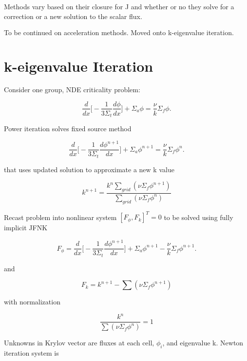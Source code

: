 \documentclass{article}
\begin{document}
Methods vary based on their closure for J and whether or no they solve for a correction or a new solution to the scalar flux.

To be continued on acceleration methods. Moved onto k-eigenvalue iteration.

\section*{k-eigenvalue Iteration}

Consider one group, NDE criticality problem:

\begin{equation*}
\frac{d}{dx} \bigg [ - \frac{1}{3 \Sigma_t} \frac{ d \phi}{dx} \bigg ] + \Sigma_a \phi = \frac{\nu}{k} \Sigma_f \phi.
\end{equation*}

Power iteration solves fixed source method

\begin{equation*}
\frac{d}{dx} \bigg [ - \frac{1}{3 \Sigma_t} \frac{ d \phi^{n+1}}{dx} \bigg ] + \Sigma_a \phi^{n+1} = \frac{\nu}{k} \Sigma_f \phi^{n}.
\end{equation*}

that uses updated solution to approximate a new k value

\begin{equation*}
k^{n+1} = \frac{k^n \sum_{grid} (\nu \Sigma_f \phi^{n+1})}{\sum_{grid}(\nu \Sigma_f \phi^n)}
\end{equation*}

Recast problem into nonlinear system $[F_\phi,F_k]^T = 0$ to be solved using fully implicit JFNK

\begin{equation*}
F_\phi = \frac{d}{dx} \bigg [ - \frac{1}{3 \Sigma_t} \frac{ d \phi^{n+1}}{dx} \bigg ] + \Sigma_a \phi^{n+1} - \frac{\nu}{k} \Sigma_f \phi^{n+1}.
\end{equation*}

and

\begin{equation*}
F_k = k^{n+1} - \sum(\nu \Sigma_f \phi^{n+1})
\end{equation*}

with normalization 

\begin{equation*}
\frac{k^n}{\sum (\nu \Sigma_f \phi^n)} = 1
\end{equation*}

Unknowns in Krylov vector are fluxes at each cell, $\phi_i$, and eigenvalue k. Newton iteration system is
\end{document}
